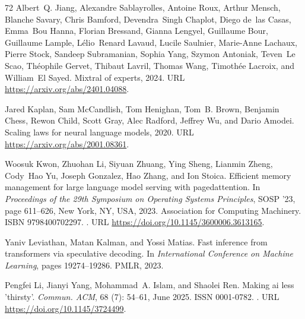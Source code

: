 \begin{thebibliography}{72}
Albert~Q. Jiang, Alexandre Sablayrolles, Antoine Roux, Arthur Mensch, Blanche Savary, Chris Bamford, Devendra~Singh Chaplot, Diego de~las Casas, Emma~Bou Hanna, Florian Bressand, Gianna Lengyel, Guillaume Bour, Guillaume Lample, Lélio~Renard Lavaud, Lucile Saulnier, Marie-Anne Lachaux, Pierre Stock, Sandeep Subramanian, Sophia Yang, Szymon Antoniak, Teven~Le Scao, Théophile Gervet, Thibaut Lavril, Thomas Wang, Timothée Lacroix, and William~El Sayed.
\newblock Mixtral of experts, 2024.
\newblock URL \url{https://arxiv.org/abs/2401.04088}.

Jared Kaplan, Sam McCandlish, Tom Henighan, Tom~B. Brown, Benjamin Chess, Rewon Child, Scott Gray, Alec Radford, Jeffrey Wu, and Dario Amodei.
\newblock Scaling laws for neural language models, 2020.
\newblock URL \url{https://arxiv.org/abs/2001.08361}.

Woosuk Kwon, Zhuohan Li, Siyuan Zhuang, Ying Sheng, Lianmin Zheng, Cody~Hao Yu, Joseph Gonzalez, Hao Zhang, and Ion Stoica.
\newblock Efficient memory management for large language model serving with pagedattention.
\newblock In \emph{Proceedings of the 29th Symposium on Operating Systems Principles}, SOSP '23, page 611–626, New York, NY, USA, 2023. Association for Computing Machinery.
\newblock ISBN 9798400702297.
\newblock {}.
\newblock URL \url{https://doi.org/10.1145/3600006.3613165}.

Yaniv Leviathan, Matan Kalman, and Yossi Matias.
\newblock Fast inference from transformers via speculative decoding.
\newblock In \emph{International Conference on Machine Learning}, pages 19274--19286. PMLR, 2023.

Pengfei Li, Jianyi Yang, Mohammad~A. Islam, and Shaolei Ren.
\newblock Making ai less 'thirsty'.
\newblock \emph{Commun. ACM}, 68 (7): 54–61, June 2025.
\newblock ISSN 0001-0782.
\newblock {}.
\newblock URL \url{https://doi.org/10.1145/3724499}.


\end{thebibliography}

